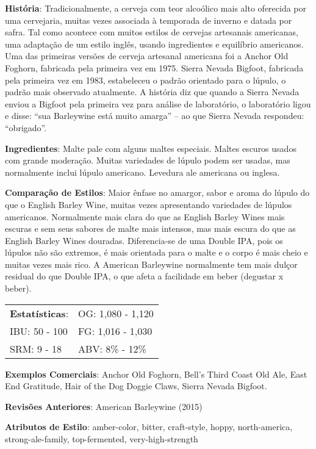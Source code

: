 \textbf{História}: Tradicionalmente, a cerveja com teor alcoólico mais alto oferecida por uma cervejaria, muitas vezes associada à temporada de inverno e datada por safra. Tal como acontece com muitos estilos de cervejas artesanais americanas, uma adaptação de um estilo inglês, usando ingredientes e equilíbrio americanos. Uma das primeiras versões de cerveja artesanal americana foi a Anchor Old Foghorn, fabricada pela primeira vez em 1975. Sierra Nevada Bigfoot, fabricada pela primeira vez em 1983, estabeleceu o padrão orientado para o lúpulo, o padrão mais observado atualmente. A história diz que quando a Sierra Nevada enviou a Bigfoot pela primeira vez para análise de laboratório, o laboratório ligou e disse: “sua Barleywine está muito amarga” – ao que Sierra Nevada respondeu: “obrigado”.

\textbf{Ingredientes}: Malte pale com alguns maltes especiais. Maltes escuros usados com grande moderação. Muitas variedades de lúpulo podem ser usadas, mas normalmente inclui lúpulo americano. Levedura ale americana ou inglesa.

\textbf{Comparação de Estilos}: Maior ênfase no amargor, sabor e aroma do lúpulo do que o English Barley Wine, muitas vezes apresentando variedades de lúpulos americanos. Normalmente mais clara do que as English Barley Wines mais escuras e sem seus sabores de malte mais intensos, mas mais escura do que as English Barley Wines douradas. Diferencia-se de uma Double IPA, pois os lúpulos não são extremos, é mais orientada para o malte e o corpo é mais cheio e muitas vezes mais rico. A American Barleywine normalmente tem mais dulçor residual do que Double IPA, o que afeta a facilidade em beber (degustar x beber).

\begin{tabular}{@{}p{35mm}p{35mm}@{}}
  \textbf{Estatísticas}: & OG: 1,080 - 1,120  \\
  IBU: 50 - 100  & FG: 1,016 - 1,030  \\
  SRM: 9 - 18 & ABV: 8\% - 12\%
\end{tabular}

\textbf{Exemplos Comerciais}: Anchor Old Foghorn, Bell's Third Coast Old Ale, East End Gratitude, Hair of the Dog Doggie Claws, Sierra Nevada Bigfoot.

\textbf{Revisões Anteriores}: American Barleywine (2015)

\textbf{Atributos de Estilo}: amber-color, bitter, craft-style, hoppy, north-america, strong-ale-family, top-fermented, very-high-strength
